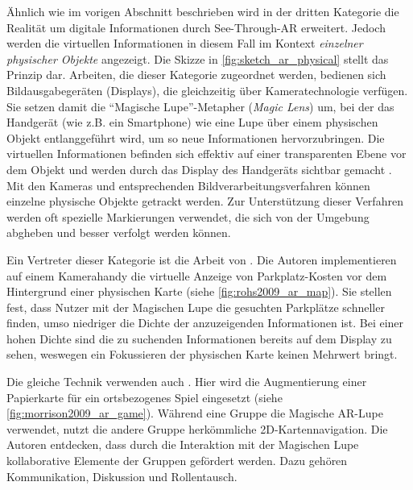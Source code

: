 Ähnlich wie im vorigen Abschnitt beschrieben wird in der dritten Kategorie die Realität um digitale Informationen durch See-Through-AR erweitert.
Jedoch werden die virtuellen Informationen in diesem Fall im Kontext \emph{einzelner physischer Objekte} angezeigt.
Die Skizze in \autoref{fig:sketch_ar_physical} stellt das Prinzip dar.
Arbeiten, die dieser Kategorie zugeordnet werden, bedienen sich Bildausgabegeräten (Displays), die gleichzeitig über Kameratechnologie verfügen.
Sie setzen damit die \enquote{Magische Lupe}-Metapher (\emph{Magic Lens}) um, bei der das Handgerät (wie z.B. ein Smartphone) wie eine Lupe über einem physischen Objekt entlanggeführt wird, um so neue Informationen hervorzubringen.
Die virtuellen Informationen befinden sich effektiv auf einer transparenten Ebene vor dem Objekt und werden durch das Display des Handgeräts sichtbar gemacht \parencite{Bier1994}.
Mit den Kameras und entsprechenden Bildverarbeitungsverfahren können einzelne physische Objekte getrackt werden.
Zur Unterstützung dieser Verfahren werden oft spezielle Markierungen verwendet, die sich von der Umgebung abgheben und besser verfolgt werden können.

Ein Vertreter dieser Kategorie ist die Arbeit von \textcite{Rohs2009}.
Die Autoren implementieren auf einem Kamerahandy die virtuelle Anzeige von Parkplatz-Kosten vor dem Hintergrund einer physischen Karte (siehe \autoref{fig:rohs2009_ar_map}).
Sie stellen fest, dass Nutzer mit der Magischen Lupe die gesuchten Parkplätze schneller finden, umso niedriger die Dichte der anzuzeigenden Informationen ist.
Bei einer hohen Dichte sind die zu suchenden Informationen bereits auf dem Display zu sehen, weswegen ein Fokussieren der physischen Karte keinen Mehrwert bringt.

Die gleiche Technik verwenden auch \textcite{Morrison2009}.
Hier wird die Augmentierung einer Papierkarte für ein ortsbezogenes Spiel eingesetzt (siehe \autoref{fig:morrison2009_ar_game}).
Während eine Gruppe die Magische AR-Lupe verwendet, nutzt die andere Gruppe herkömmliche 2D-Kartennavigation.
Die Autoren entdecken, dass durch die Interaktion mit der Magischen Lupe kollaborative Elemente der Gruppen gefördert werden.
Dazu gehören Kommunikation, Diskussion und Rollentausch.

